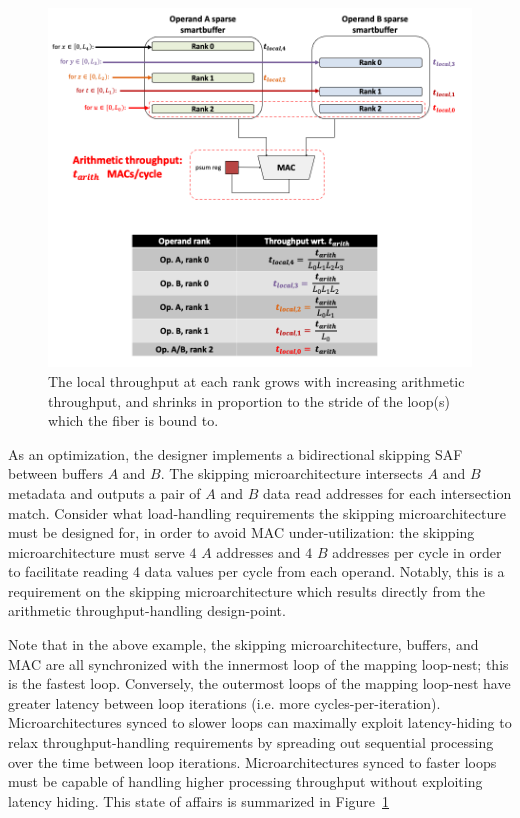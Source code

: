 \begin{itemize}
    \begin{figure}[H]
        \centering
        \includegraphics[width=\linewidth]{figures/local_throughput_diagram.png}
        \caption{The local throughput at each rank grows with increasing arithmetic throughput, and shrinks in proportion to the stride of the loop(s) which the fiber is bound to.}
        \label{fig:local_throughput_diagram}
    \end{figure}
    
    As an optimization, the designer implements a bidirectional skipping SAF between buffers $A$ and $B$. The skipping microarchitecture intersects $A$ and $B$ metadata and outputs a pair of $A$ and $B$ data read addresses for each intersection match. Consider what load-handling requirements the skipping microarchitecture must be designed for, in order to avoid MAC under-utilization: the skipping microarchitecture must serve $4$ $A$ addresses and $4$ $B$ addresses per cycle in order to facilitate reading 4 data values per cycle from each operand. Notably, this is a requirement on the skipping microarchitecture which results directly from the arithmetic throughput-handling design-point.

    Note that in the above example, the skipping microarchitecture, buffers, and MAC are all synchronized with the innermost loop of the mapping loop-nest; this is the fastest loop. Conversely, the outermost loops of the mapping loop-nest have greater latency between loop iterations (i.e. more cycles-per-iteration). Microarchitectures synced to slower loops can maximally exploit latency-hiding to relax throughput-handling requirements by spreading out sequential processing over the time between loop iterations. Microarchitectures synced to faster loops must be capable of handling higher processing throughput without exploiting latency hiding. This state of affairs is summarized in Figure~\ref{fig:local_throughput_diagram}
    

\end{itemize}
